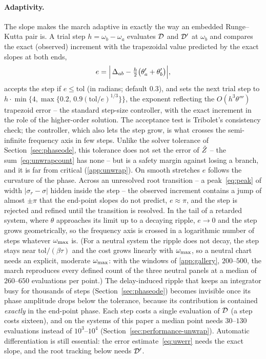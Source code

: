 \paragraph{Adaptivity.} The slope makes the march adaptive in exactly the way
an embedded Runge--Kutta pair is. A trial step $h=\omega_b-\omega_a$ evaluates
$\mathcal{D}$ and $\mathcal{D}'$ at $\omega_b$ and compares the exact (observed) increment
with the trapezoidal value predicted by the exact slopes at both ends,
\begin{equation}\label{eq:uwerr}
  e = \Bigl|\,\Delta_{ab} - \tfrac{h}{2}\bigl(\theta'_a+\theta'_b\bigr)\Bigr| ,
\end{equation}
accepts the step if $e\le\mathrm{tol}$ (in radians; default $0.3$), and sets
the next trial step to $h\cdot\min\{4,\max\{0.2,\,0.9(\mathrm{tol}/e)^{1/3}\}\}$,
the exponent reflecting the $O(h^{3}\theta''')$ trapezoid error -- the standard
step-size controller, with the exact increment in the role of the
higher-order solution. The acceptance test is Tribolet's consistency check;
the controller, which also lets the step grow, is what crosses the
semi-infinite frequency axis in few steps. Unlike the solver tolerance of
Section~\ref{sec:phaseode}, this tolerance does not set the error of $\tilde{Z}$
-- the sum~\eqref{eq:unwrapcount} has none -- but is a safety margin against
losing a branch, and it is far from critical (\ref{app:unwrap}). On
smooth stretches $e$ follows the curvature of the phase. Across an unresolved root transition -- a peak~\eqref{eq:peak} of width
$|\sigma_r-\sigma|$ hidden inside the step -- the observed increment contains a
jump of almost $\pm\pi$ that the end-point slopes do not predict, $e\approx\pi$,
and the step is rejected and refined until the transition is resolved. In the
tail of a retarded system, where $\theta$ approaches its limit up to a
decaying ripple, $e\to0$ and the step grows geometrically, so the frequency
axis is crossed in a logarithmic number of steps whatever $\omega_{\mathrm{max}}$ is. (For a
neutral system the ripple does not decay, the step stays near
$\mathrm{tol}/(\beta\tau)$ and the cost grows linearly with $\omega_{\mathrm{max}}$, so a
neutral chart needs an explicit, moderate $\omega_{\mathrm{max}}$: with the windows of
\ref{app:gallery}, $200$--$500$, the march reproduces every defined count of
the three neutral panels at a median of $260$--$650$ evaluations per point.)
The delay-induced ripple that keeps an integrator busy for thousands of steps
(Section~\ref{sec:phaseode}) becomes invisible once its phase amplitude drops
below the tolerance, because its contribution is contained \emph{exactly} in
the end-point phase. Each step costs a single
evaluation of $\mathcal{D}$ (a  step costs sixteen), and on the systems of
this paper a median point needs $30$--$130$ evaluations instead of
$10^{3}$--$10^{4}$ (Section~\ref{sec:performance-unwrap}). Automatic
differentiation is still essential: the error estimate~\eqref{eq:uwerr} needs the
exact slope, and the root tracking below needs $\mathcal{D}'$.

